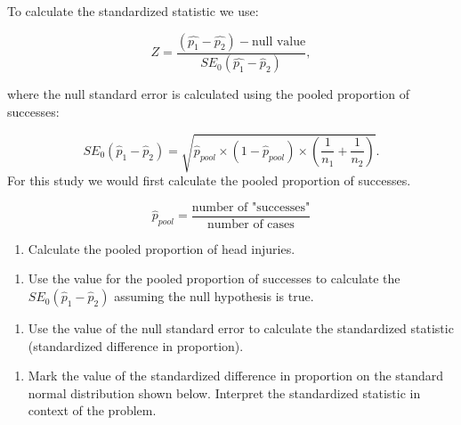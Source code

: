 \documentclass[
]{report}
\providecommand{\tightlist}{%
  \setlength{\itemsep}{0pt}\setlength{\parskip}{0pt}}
\begin{document}
To calculate the standardized statistic we use:

\[
Z = \frac{(\hat{p_1} - \hat{p_2}) - \text{null value}}{SE_0(\hat{p_1}-\hat{p}_2)},
\]

where the null standard error is calculated using the pooled proportion of successes:

\[
SE_0(\hat{p}_1-\hat{p}_2)=\sqrt{\hat{p}_{pool}\times (1-\hat{p}_{pool})\times \left(\frac{1}{n_1}+\frac{1}{n_2}\right)}.
\]
For this study we would first calculate the pooled proportion of successes.

\[\hat{p}_{pool} = \frac{\text{number of "successes"}}{\text{number of cases}} \]
\vspace{1mm}

\begin{enumerate}
\def\labelenumi{\arabic{enumi}.}
\setcounter{enumi}{4}
\tightlist
\item
  Calculate the pooled proportion of head injuries.
\end{enumerate}

\vspace{1in}

\begin{enumerate}
\def\labelenumi{\arabic{enumi}.}
\setcounter{enumi}{5}
\tightlist
\item
  Use the value for the pooled proportion of successes to calculate the \(SE_0(\hat{p}_1 - \hat{p}_2)\) assuming the null hypothesis is true.
\end{enumerate}

\vspace{1in}

\begin{enumerate}
\def\labelenumi{\arabic{enumi}.}
\setcounter{enumi}{6}
\tightlist
\item
  Use the value of the null standard error to calculate the standardized statistic (standardized difference in proportion).
\end{enumerate}

\vspace{1in}

\newpage

\begin{enumerate}
\def\labelenumi{\arabic{enumi}.}
\setcounter{enumi}{7}
\tightlist
\item
  Mark the value of the standardized difference in proportion on the standard normal distribution shown below. Interpret the standardized statistic in context of the problem.
\end{enumerate}
\end{document}
